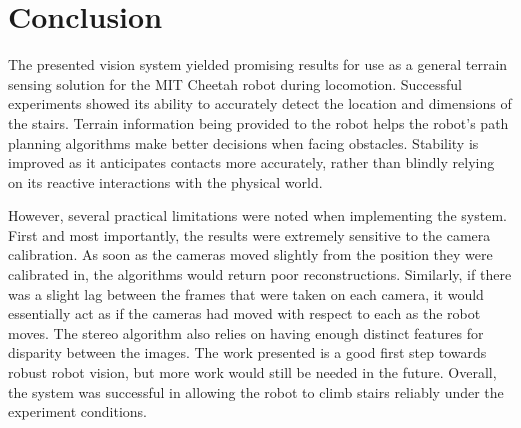 
\section{Conclusion}

The presented vision system yielded promising results for use as a general terrain sensing solution for the MIT Cheetah robot during locomotion. Successful experiments showed its ability to accurately detect the location and dimensions of the stairs. Terrain information being provided to the robot helps the robot's path planning algorithms make better decisions when facing obstacles. Stability is improved as it anticipates contacts more accurately, rather than blindly relying on its reactive interactions with the physical world.

However, several practical limitations were noted when implementing the system. First and most importantly, the results were extremely sensitive to the camera calibration. As soon as the cameras moved slightly from the position they were calibrated in, the algorithms would return poor reconstructions. Similarly, if there was a slight lag between the frames that were taken on each camera, it would essentially act as if the cameras had moved with respect to each as the robot moves. The stereo algorithm also relies on having enough distinct features for disparity between the images. The work presented is a good first step towards robust robot vision, but more work would still be needed in the future. Overall, the system was successful in allowing the robot to climb stairs reliably under the experiment conditions.